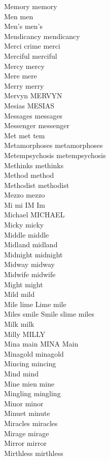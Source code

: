 Memory memory\\
Men men\\
Men's men's\\
Mendicancy mendicancy\\
Merci crime merci\\
Merciful merciful\\
Mercy mercy\\
Mere mere\\
Merry merry\\
Mervyn MERVYN\\
Mesias MESIAS\\
Messages messages\\
Messenger messenger\\
Met met tem\\
Metamorphoses metamorphoses\\
Metempsychosis metempsychosis\\
Methinks methinks\\
Method method\\
Methodist methodist\\
Mezzo mezzo\\
Mi mi IM Im\\
Michael MICHAEL\\
Micky micky\\
Middle middle\\
Midland midland\\
Midnight midnight\\
Midway midway\\
Midwife midwife\\
Might might\\
Mild mild\\
Mile lime Lime mile\\
Miles smile Smile slime miles\\
Milk milk\\
Milly MILLY\\
Mina main MINA Main\\
Minagold minagold\\
Mincing mincing\\
Mind mind\\
Mine mien mine\\
Mingling mingling\\
Minor minor\\
Minuet minute\\
Miracles miracles\\
Mirage mirage\\
Mirror mirror\\
Mirthless mirthless\\
